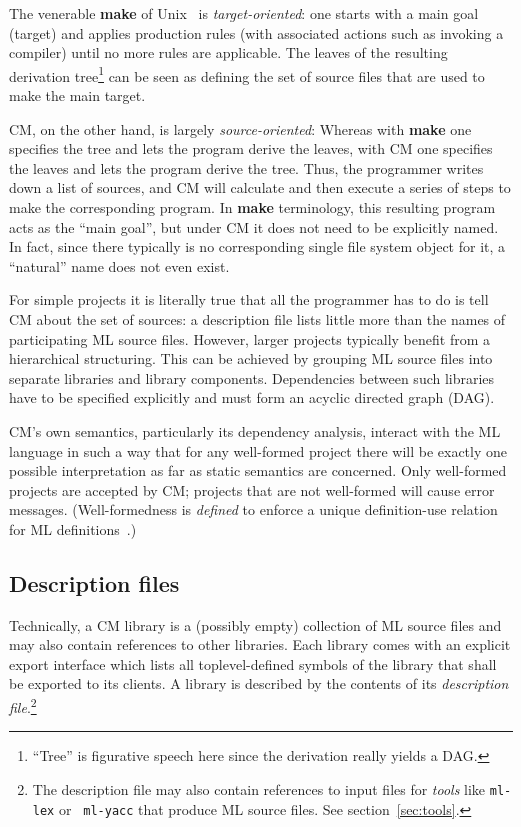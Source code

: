 \documentclass[titlepage,letterpaper]{article}
\begin{document}
The venerable {\bf make} of Unix~\cite{feldman79} is {\em
target-oriented}\/: one starts with a main goal (target) and applies
production rules (with associated actions such as invoking a compiler)
until no more rules are applicable. The leaves of the resulting
derivation tree\footnote{``Tree'' is figurative speech here since the
derivation really yields a DAG.} can be seen as defining the set of
source files that are used to make the main target.

CM, on the other hand, is largely {\em source-oriented}\/: Whereas
with {\bf make} one specifies the tree and lets the program derive the
leaves, with CM one specifies the leaves and lets the program derive
the tree.  Thus, the programmer writes down a list of sources, and CM
will calculate and then execute a series of steps to make the
corresponding program.  In {\bf make} terminology, this resulting
program acts as the ``main goal'', but under CM it does not need to be
explicitly named.  In fact, since there typically is no corresponding
single file system object for it, a ``natural'' name does not even
exist.

For simple projects it is literally true that all the programmer has
to do is tell CM about the set of sources: a description file lists
little more than the names of participating ML source files. However,
larger projects typically benefit from a hierarchical structuring.
This can be achieved by grouping ML source files into separate
libraries and library components.  Dependencies between such libraries
have to be specified explicitly and must form an acyclic directed
graph (DAG).

CM's own semantics, particularly its dependency analysis, interact
with the ML language in such a way that for any well-formed project
there will be exactly one possible interpretation as far as static
semantics are concerned.  Only well-formed projects are accepted by
CM; projects that are not well-formed will cause error messages.
(Well-formedness is {\em defined} to enforce a unique definition-use
relation for ML definitions~\cite{blume:depend99}.)

\subsection{Description files}

Technically, a CM library is a (possibly empty) collection of ML
source files and may also contain references to other libraries.  Each
library comes with an explicit export interface which lists all
toplevel-defined symbols of the library that shall be exported to its
clients.  A library is described by the contents of its {\em
description file}.\footnote{The description file may also contain
references to input files for {\em tools} like {\tt ml-lex} or {\tt
ml-yacc} that produce ML source files.  See section~\ref{sec:tools}.}
\end{document}

